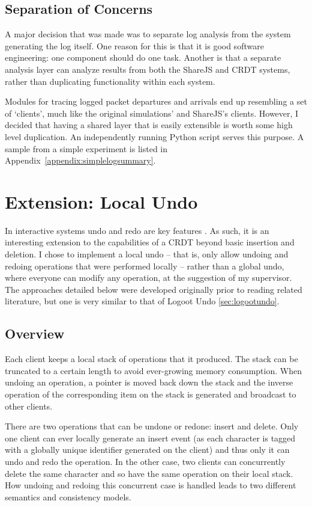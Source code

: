 \documentclass[12pt,a4paper,twoside,openright]{report}
\begin{document}
	
	\subsection{Separation of Concerns}
	
	A major decision that was made was to separate log analysis from the system generating the log itself. One reason for this is that it is good software engineering: one component should do one task. Another is that a separate analysis layer can analyze results from both the ShareJS and CRDT systems, rather than duplicating functionality within each system. 
	
	Modules for tracing logged packet departures and arrivals end up resembling a set of `clients', much like the original simulations' and ShareJS's clients. However, I decided that having a shared layer that is easily extensible is worth some high level duplication. An independently running Python script serves this purpose. A sample from a simple experiment is listed in Appendix~\ref{appendix:simplelogsummary}.	
	
	
	
\section{Extension: Local Undo} \label{sec:undo}
	
	In interactive systems undo and redo are key features \cite{shneiderman1982}. As such, it is an interesting extension to the capabilities of a CRDT beyond basic insertion and deletion. I chose to implement a local undo -- that is, only allow undoing and redoing operations that were performed locally -- rather than a global undo, where everyone can modify any operation, at the suggestion of my supervisor. The approaches detailed below were developed originally prior to reading related literature, but one is very similar to that of Logoot Undo \cref{sec:logootundo}.
	
	\subsection{Overview}
	Each client keeps a local stack of operations that it produced. The stack can be truncated to a certain length to avoid ever-growing memory consumption. When undoing an operation, a pointer is moved back down the stack and the inverse operation of the corresponding item on the stack is generated and broadcast to other clients.
	
	There are two operations that can be undone or redone: insert and delete. Only one client can ever locally generate an insert event (as each character is tagged with a globally unique identifier generated on the client) and thus only it can undo and redo the operation. In the other case, two clients can concurrently delete the same character and so have the same operation on their local stack. How undoing and redoing this concurrent case is handled leads to two different semantics and consistency models.
	
\end{document}
